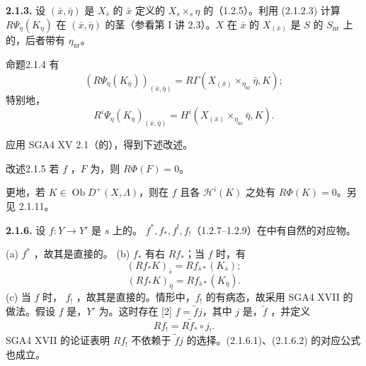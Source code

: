 \textbf{2.1.3.} 设 $(\bar x,\bar\eta)$ 是 $X_{\bar s}$ 的 $\bar x$ 定义的 $X_s\times_s\eta$ 的（1.2.5）。利用 (2.1.2.3) 计算 $R\Psi_\eta(K_\eta)$ 在 $(\bar x,\bar\eta)$ 的茎（参看第 I 讲 2.3）。$X$ 在 $\bar x$ 的 $X_{(\bar x)}$ 是 $S$ 的 $S_{\mathrm{nr}}$ 上的，后者带有 $\eta_{\mathrm{nr}}$。
\begin{SGAresult}{命题}{2.1.4}
有
\[(R\Psi_\eta(K_\eta))_{(\bar x,\bar\eta)}=R\Gamma(X_{(\bar x)}\times_{\eta_{\mathrm{nr}}}\bar\eta,K);\]
特别地，
\[R^i\Psi_\eta(K_\eta)_{(\bar x,\bar\eta)}=H^i(X_{(\bar x)}\times_{\eta_{\mathrm{nr}}}\bar\eta,K).\]
\end{SGAresult}
应用 SGA4 XV 2.1（的），得到下述改述。
\begin{SGAresult}{改述}{2.1.5}
若 $f$ ，$F$ 为，则 $R\Phi(F)=0$。
\end{SGAresult}
更地，若 $K\in\operatorname{Ob}D^+(X,\Lambda)$，则在 $f$ 且各 $\mathscr H^i(K)$ 之处有 $R\Phi(K)=0$。另见 2.1.11。

\textbf{2.1.6.} 设 $f:Y\to Y'$ 是 $s$ 上的。 $f^*,f_*,f^!,f_!$（1.2.7--1.2.9）在中有自然的对应物。

(a)  $f^*$ ，故其是直接的。
(b)  $f_*$ 有右 $Rf_*$；当 $f$ 时，有
\[(Rf_*K)_{\bar s}=Rf_{\bar s*}(K_{\bar s});\tag{2.1.6.1}\]
\[(Rf_*K)_{\bar\eta}=Rf_{\bar s*}(K_{\bar\eta}).\tag{2.1.6.2}\]
(c) 当 $f$ 时， $f_!$ ，故其是直接的。情形中，$f_!$ 的有病态，故采用 SGA4 XVII 的做法。假设 $f$ 是，$Y'$ 为。这时存在 [2] $f=\widetilde f j$，其中 $j$ 是，$\widetilde f$ ，并定义
\[Rf_!=R\widetilde f_*\circ j_!.\]
SGA4 XVII 的论证表明 $Rf_!$ 不依赖于 $\widetilde f j$ 的选择。(2.1.6.1)、(2.1.6.2) 的对应公式也成立。

